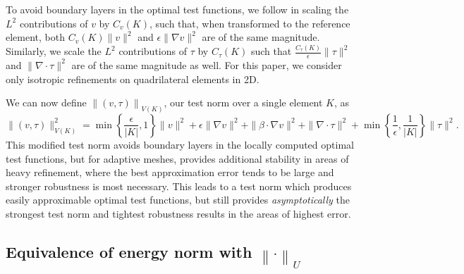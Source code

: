 \documentclass[11pt,onecolumn]{scrartcl}
\newcommand{\nor}[1]{\left\| #1 \right\|}
\newcommand{\LRp}[1]{\left( #1 \right)}
\newcommand{\grad}{\nabla}
\renewcommand{\div}{\grad \cdot}
\begin{document}
To avoid boundary layers in the optimal test functions, we follow \cite{DPGrobustness} in scaling the $L^2$ contributions of $v$ by $C_v(K)$, such that, when transformed to the reference element, both $C_v(K)\|v\|^2$ and $\epsilon\|\grad v\|^2$ are of the same magnitude. Similarly, we scale the $L^2$ contributions of $\tau$ by $C_\tau(K)$ such that $\frac{C_\tau(K)}{\epsilon} \|\tau\|^2$ and $\|\div \tau\|^2$ are of the same magnitude as well. For this paper, we consider only isotropic refinements on quadrilateral elements in 2D.

We can now define $\nor{\LRp{v,\tau}}_{V(K)}$, our test norm over a single element $K$, as 
\[
\|\left(v,\tau\right)\|_{V(K)}^2 = \min\left\{\frac{\epsilon}{|K|},1\right\}\|v\|^2 + \epsilon \|\grad v\|^2 + \|\beta \cdot \grad v\|^2 + \| \div \tau\|^2 + \min\left\{\frac{1}{\epsilon},\frac{1}{|K|}\right\}\|\tau\|^2.
\]
This modified test norm avoids boundary layers in the locally computed optimal test functions, but for adaptive meshes, provides additional stability in areas of heavy refinement, where the best approximation error tends to be large and stronger robustness is most necessary.  This leads to a test norm which produces easily approximable optimal test functions, but still provides \textit{asymptotically} the strongest test norm and tightest robustness results in the areas of highest error. 

\subsection{Equivalence of energy norm with $\nor{\cdot}_U$}
\label{sec:main_bounds}
\end{document}
